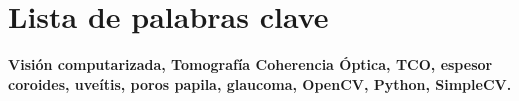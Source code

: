 \chapter{Lista de palabras clave}
\textbf{Visión computarizada, Tomografía Coherencia Óptica, TCO,
  espesor coroides, uveítis, poros papila, glaucoma, OpenCV, Python,
  SimpleCV.}

